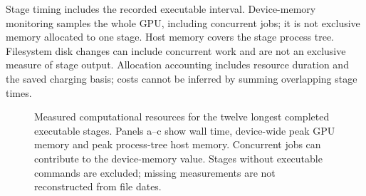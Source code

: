 \documentclass[11pt]{article}
\begin{document}
Stage timing includes the recorded executable interval. Device-memory monitoring samples the
whole GPU, including concurrent jobs; it is not exclusive memory allocated to one stage.
Host memory covers the stage process tree. Filesystem disk changes can include concurrent work
and are not an exclusive measure of stage output. Allocation accounting includes resource
duration and the saved charging basis; costs cannot be inferred by summing overlapping stage times.




\begin{figure}[p]
\centering
\caption{Measured computational resources for the twelve longest completed executable stages.
Panels a--c show wall time, device-wide peak GPU memory and peak process-tree host memory.
Concurrent jobs can contribute to the device-memory value. Stages without executable commands
are excluded; missing measurements are not reconstructed from file dates.}
\label{fig:resources}
\end{figure}
\clearpage

\clearpage

\end{document}
